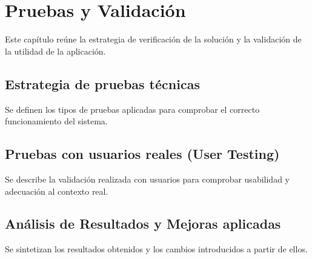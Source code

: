 \chapter{Pruebas y Validación}
\label{cap:pruebasValidacion}

Este capítulo reúne la estrategia de verificación de la solución y la validación de la utilidad de la aplicación.

\section{Estrategia de pruebas técnicas}

Se definen los tipos de pruebas aplicadas para comprobar el correcto funcionamiento del sistema.

\section{Pruebas con usuarios reales (User Testing)}

Se describe la validación realizada con usuarios para comprobar usabilidad y adecuación al contexto real.

\section{Análisis de Resultados y Mejoras aplicadas}

Se sintetizan los resultados obtenidos y los cambios introducidos a partir de ellos.